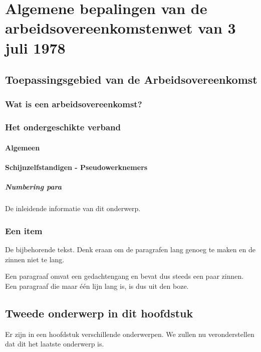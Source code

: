 \chapter{Algemene bepalingen van de arbeidsovereenkomstenwet van          3 juli 1978}
\label{hoofdstuk:1}


\section{Toepassingsgebied van de Arbeidsovereenkomst}

\subsection{Wat is een arbeidsovereenkomst?}

\subsection{Het ondergeschikte verband}

\subsubsection{Algemeen}

\subsubsection{Schijnzelfstandigen - Pseudowerknemers}

\paragraph{Numbering para}


De inleidende informatie van dit onderwerp.

\subsection{Een item}
De bijbehorende tekst. Denk eraan om de paragrafen lang genoeg te maken en
de zinnen niet te lang.

Een paragraaf omvat een gedachtengang en bevat dus steeds een paar zinnen.
Een paragraaf die maar \'e\'en lijn lang is, is dus uit den boze.

\section{Tweede onderwerp in dit hoofdstuk}
Er zijn in een hoofdstuk verschillende onderwerpen. We zullen nu
veronderstellen dat dit het laatste onderwerp is.

